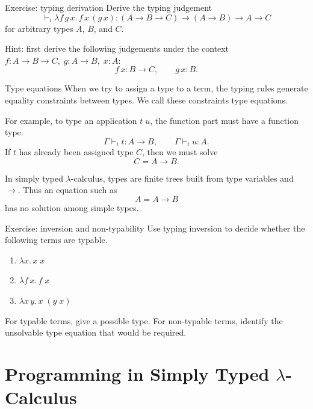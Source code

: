 \begin{frame}{Exercise: typing derivation}
  Derive the typing judgement
  \[
    \vdash_i
    \lambda f\,g\,x.\,f\,x\,(g\,x)
    :
    (A \to B \to C) \to (A \to B) \to A \to C
  \]
  for arbitrary types $A$, $B$, and $C$.

  \vfill

  Hint: first derive the following judgements under the context
  $f : A \to B \to C,\; g : A \to B,\; x : A$:
  \[
    f\,x : B \to C,
    \qquad
    g\,x : B.
  \]
\end{frame}

\begin{frame}{Type equations}
  When we try to assign a type to a term, the typing rules generate equality
  constraints between types.  We call these constraints \alert{type equations}.

  \vfill

  For example, to type an application $t\;u$, the function part must have a
  function type:
  \[
    \Gamma \vdash_i t : A \to B,
    \qquad
    \Gamma \vdash_i u : A.
  \]
  If $t$ has already been assigned type $C$, then we must solve
  \[
    C = A \to B.
  \]

  \vfill

  In simply typed $\lambda$-calculus, types are finite trees built from type
  variables and $\to$.  Thus an equation such as
  \[
    A = A \to B
  \]
  has no solution among simple types.
\end{frame}

\begin{frame}{Exercise: inversion and non-typability}
  Use typing inversion to decide whether the following terms are typable.

  \begin{enumerate}
    \item $\lambda x.\,x\;x$
    \item $\lambda f\,x.\,f\;x$
    \item $\lambda x\,y.\,x\;(y\;x)$
  \end{enumerate}

  \vfill

  For typable terms, give a possible type.  For non-typable terms, identify
  the unsolvable type equation that would be required.
\end{frame}

\section{Programming in Simply Typed \texorpdfstring{$\lambda$}{λ}-Calculus}

